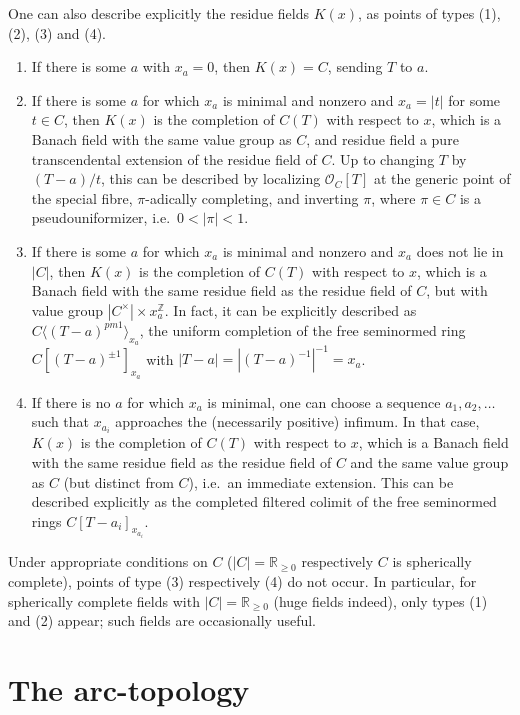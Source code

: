 \documentclass[11pt]{amsart}
\numberwithin{equation}{section}
\numberwithin{theorem}{section}
\theoremstyle{definition}
\begin{document}
One can also describe explicitly the residue fields $K(x)$, as points of types (1), (2), (3) and (4).
\begin{enumerate}
\item[(1)] If there is some $a$ with $x_a=0$, then $K(x)=C$, sending $T$ to $a$.
\item[(2)] If there is some $a$ for which $x_a$ is minimal and nonzero and $x_a=|t|$ for some $t\in C$, then $K(x)$ is the completion of $C(T)$ with respect to $x$, which is a Banach field with the same value group as $C$, and residue field a pure transcendental extension of the residue field of $C$. Up to changing $T$ by $(T-a)/t$, this can be described by localizing $\mathcal O_C[T]$ at the generic point of the special fibre, $\pi$-adically completing, and inverting $\pi$, where $\pi\in C$ is a pseudouniformizer, i.e.~$0<|\pi|<1$.
\item[(3)] If there is some $a$ for which $x_a$ is minimal and nonzero and $x_a$ does not lie in $|C|$, then $K(x)$ is the completion of $C(T)$ with respect to $x$, which is a Banach field with the same residue field as the residue field of $C$, but with value group $|C^\times|\times x_a^{\mathbb Z}$. In fact, it can be explicitly described as $C\langle (T-a)^{pm 1}\rangle_{x_a}$, the uniform completion of the free seminormed ring $C[(T-a)^{\pm 1}]_{x_a}$ with $|T-a|=|(T-a)^{-1}|^{-1}=x_a$.
\item[(4)] If there is no $a$ for which $x_a$ is minimal, one can choose a sequence $a_1,a_2,\ldots$ such that $x_{a_i}$ approaches the (necessarily positive) infimum. In that case, $K(x)$ is the completion of $C(T)$ with respect to $x$, which is a Banach field with the same residue field as the residue field of $C$ and the same value group as $C$ (but distinct from $C$), i.e.~an immediate extension. This can be described explicitly as the completed filtered colimit of the free seminormed rings $C[T-a_i]_{x_{a_i}}$.
\end{enumerate}

Under appropriate conditions on $C$ ($|C|=\mathbb R_{\geq 0}$ respectively $C$ is spherically complete), points of type (3) respectively (4) do not occur. In particular, for spherically complete fields with $|C|=\mathbb R_{\geq 0}$ (huge fields indeed), only types (1) and (2) appear; such fields are occasionally useful.

\section{The arc-topology}
\end{document}
